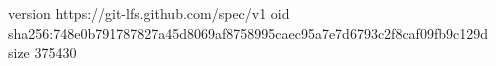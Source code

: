 version https://git-lfs.github.com/spec/v1
oid sha256:748e0b791787827a45d8069af8758995caec95a7e7d6793c2f8caf09fb9c129d
size 375430
